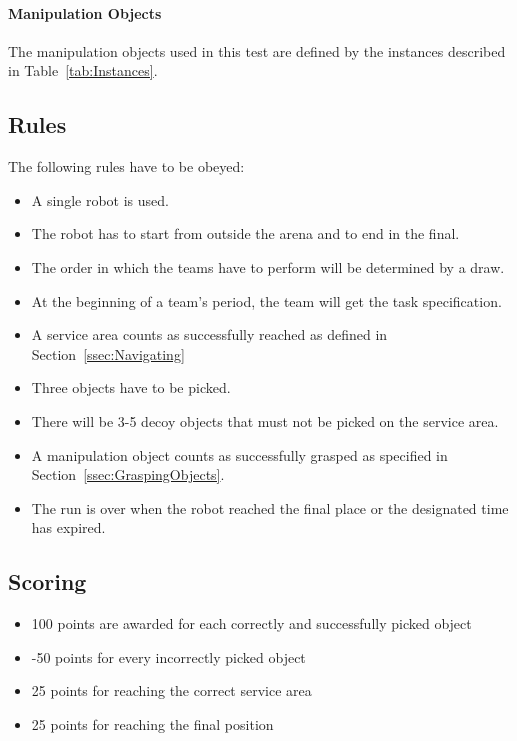 \paragraph{Manipulation Objects}
The manipulation objects used in this test are defined by the instances described in Table~\ref{tab:Instances}.

\subsection{Rules}
The following rules have to be obeyed:

\begin{itemize}
\item A single robot is used.
\item The robot has to start from outside the arena and to end in the final.
\item The order in which the teams have to perform will be determined by a draw.
\item At the beginning of a team's period, the team will get the task specification.
\item A service area counts as successfully reached as defined in Section~\ref{ssec:Navigating}
\item Three objects have to be picked.
\item There will be 3-5 decoy objects that must not be picked on the service area.
\item A manipulation object counts as successfully grasped as specified in Section~\ref{ssec:GraspingObjects}.
\item The run is over when the robot reached the final place or the designated time has expired.
\end{itemize}

\subsection{Scoring}
\begin{itemize}
\item 100 points are awarded for each correctly and successfully picked object
\item -50 points for every incorrectly picked object
\item 25 points for reaching the correct service area
\item 25 points for reaching the final position
\end{itemize}
